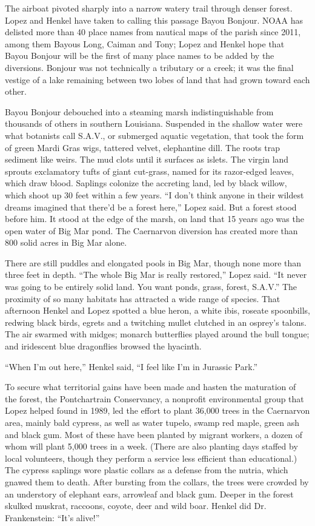 The airboat pivoted sharply into a narrow watery trail through denser
forest. Lopez and Henkel have taken to calling this passage Bayou
Bonjour. NOAA has delisted more than 40 place names from nautical maps
of the parish since 2011, among them Bayous Long, Caiman and Tony; Lopez
and Henkel hope that Bayou Bonjour will be the first of many place names
to be added by the diversions. Bonjour was not technically a tributary
or a creek; it was the final vestige of a lake remaining between two
lobes of land that had grown toward each other.

Bayou Bonjour debouched into a steaming marsh indistinguishable from
thousands of others in southern Louisiana. Suspended in the shallow
water were what botanists call S.A.V., or submerged aquatic vegetation,
that took the form of green Mardi Gras wigs, tattered velvet,
elephantine dill. The roots trap sediment like weirs. The mud clots
until it surfaces as islets. The virgin land sprouts exclamatory tufts
of giant cut-grass, named for its razor-edged leaves, which draw blood.
Saplings colonize the accreting land, led by black willow, which shoot
up 30 feet within a few years. ``I don't think anyone in their wildest
dreams imagined that there'd be a forest here,'' Lopez said. But a
forest stood before him. It stood at the edge of the marsh, on land that
15 years ago was the open water of Big Mar pond. The Caernarvon
diversion has created more than 800 solid acres in Big Mar alone.

There are still puddles and elongated pools in Big Mar, though none more
than three feet in depth. ``The whole Big Mar is really restored,''
Lopez said. ``It never was going to be entirely solid land. You want
ponds, grass, forest, S.A.V.'' The proximity of so many habitats has
attracted a wide range of species. That afternoon Henkel and Lopez
spotted a blue heron, a white ibis, roseate spoonbills, redwing black
birds, egrets and a twitching mullet clutched in an osprey's talons. The
air swarmed with midges; monarch butterflies played around the bull
tongue; and iridescent blue dragonflies browsed the hyacinth.

``When I'm out here,'' Henkel said, ``I feel like I'm in Jurassic
Park.''

To secure what territorial gains have been made and hasten the
maturation of the forest, the Pontchartrain Conservancy, a nonprofit
environmental group that Lopez helped found in 1989, led the effort to
plant 36,000 trees in the Caernarvon area, mainly bald cypress, as well
as water tupelo, swamp red maple, green ash and black gum. Most of these
have been planted by migrant workers, a dozen of whom will plant 5,000
trees in a week. (There are also planting days staffed by local
volunteers, though they perform a service less efficient than
educational.) The cypress saplings wore plastic collars as a defense
from the nutria, which gnawed them to death. After bursting from the
collars, the trees were crowded by an understory of elephant ears,
arrowleaf and black gum. Deeper in the forest skulked muskrat, raccoons,
coyote, deer and wild boar. Henkel did Dr. Frankenstein: ``It's alive!''

